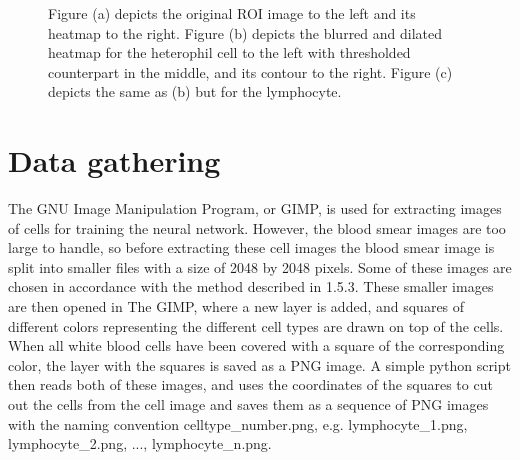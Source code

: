 \begin{figure}[H]
   \par
   \par
  \caption{Figure (a) depicts the original ROI image to the left and its heatmap to the right. Figure (b) depicts the blurred and dilated heatmap for the heterophil cell to the left with thresholded counterpart in the middle, and its contour to the right. Figure (c) depicts the same as (b) but for the lymphocyte. }
\label{fig:heatmaps}
\end{figure}

\section{Data gathering}\label{sec:research:history}
The GNU Image Manipulation Program, or GIMP, is used for extracting images of cells for training the neural network. However, the blood smear images are too large to handle, so before extracting these cell images the blood smear image is split into smaller files with a size of 2048 by 2048 pixels. Some of these images are chosen in accordance with the method described in 1.5.3. These smaller images are then opened in The GIMP, where a new layer is added, and squares of different colors representing the different cell types are drawn on top of the cells. When all white blood cells have been covered with a square of the corresponding color, the layer with the squares is saved as a PNG image. A simple python script then reads both of these images, and uses the coordinates of the squares to cut out the cells from the cell image and saves them as a sequence of PNG images with the naming convention celltype\_number.png, e.g. lymphocyte\_1.png, lymphocyte\_2.png, ..., lymphocyte\_n.png.

